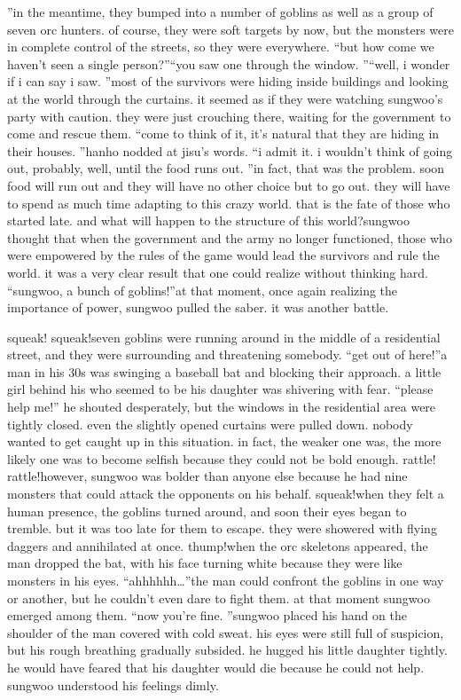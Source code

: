 ”in the meantime, they bumped into a number of goblins as well as a group of seven orc hunters.
 of course, they were soft targets by now, but the monsters were in complete control of the streets, so they were everywhere.
“but how come we haven’t seen a single person?”“you saw one through the window.
”“well, i wonder if i can say i saw.
”most of the survivors were hiding inside buildings and looking at the world through the curtains.
 it seemed as if they were watching sungwoo’s party with caution.
 they were just crouching there, waiting for the government to come and rescue them.
“come to think of it, it’s natural that they are hiding in their houses.
”hanho nodded at jisu’s words.
“i admit it.
 i wouldn’t think of going out, probably, well, until the food runs out.
”in fact, that was the problem.
 soon food will run out and they will have no other choice but to go out.
 they will have to spend as much time adapting to this crazy world.
that is the fate of those who started late.
and what will happen to the structure of this world?sungwoo thought that when the government and the army no longer functioned, those who were empowered by the rules of the game would lead the survivors and rule the world.
 it was a very clear result that one could realize without thinking hard.
“sungwoo, a bunch of goblins!”at that moment, once again realizing the importance of power, sungwoo pulled the saber.
it was another battle.


squeak! squeak!seven goblins were running around in the middle of a residential street, and they were surrounding and threatening somebody.
“get out of here!”a man in his 30s was swinging a baseball bat and blocking their approach.
 a little girl behind his who seemed to be his daughter was shivering with fear.
“please help me!” he shouted desperately, but the windows in the residential area were tightly closed.
even the slightly opened curtains were pulled down.
nobody wanted to get caught up in this situation.
in fact, the weaker one was, the more likely one was to become selfish because they could not be bold enough.
rattle! rattle!however, sungwoo was bolder than anyone else because he had nine monsters that could attack the opponents on his behalf.
squeak!when they felt a human presence, the goblins turned around, and soon their eyes began to tremble.
 but it was too late for them to escape.
they were showered with flying daggers and annihilated at once.
thump!when the orc skeletons appeared, the man dropped the bat, with his face turning white because they were like monsters in his eyes.
“ahhhhhh…”the man could confront the goblins in one way or another, but he couldn’t even dare to fight them.
 at that moment sungwoo emerged among them.
“now you’re fine.
”sungwoo placed his hand on the shoulder of the man covered with cold sweat.
his eyes were still full of suspicion, but his rough breathing gradually subsided.
 he hugged his little daughter tightly.
he would have feared that his daughter would die because he could not help.
sungwoo understood his feelings dimly.


 